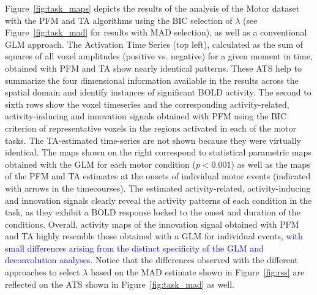 Figure~\ref{fig:task_maps} depicts the results of the analysis of the Motor
dataset with the PFM and TA algorithms using the BIC selection of $\lambda$ (see
Figure~\ref{fig:task_mad} for results with MAD selection), as well as a
conventional GLM approach. The Activation Time Series (top left), calculated as
the sum of squares of all voxel amplitudes (positive vs. negative) for a given
moment in time, obtained with PFM and TA show nearly identical patterns. These
ATS help to summarize the four dimensional information available in the results
across the spatial domain and identify instances of significant BOLD activity.
The second to sixth rows show the voxel timeseries and the corresponding
activity-related, activity-inducing and innovation signals obtained with PFM
using the BIC criterion of representative voxels in the regions activated in
each of the motor tasks. The TA-estimated time-series are not shown because they
were virtually identical. The maps shown on the right correspond to statistical
parametric maps obtained with the GLM for each motor condition ($p < 0.001$) as
well as the maps of the PFM and TA estimates at the onsets of individual motor
events (indicated with arrows in the timecourses). The estimated
activity-related, activity-inducing and innovation signals clearly reveal the
activity patterns of each condition in the task, as they exhibit a BOLD response
locked to the onset and duration of the conditions. Overall, activity maps of
the innovation signal obtained with PFM and TA highly resemble those obtained
with a GLM for individual events\textcolor{blue}{, with small differences
arising from the distinct specificity of the GLM and deconvolution analyses}.
Notice that the differences observed with the different approaches to select
$\lambda$ based on the MAD estimate shown in Figure~\ref{fig:rss} are reflected
on the ATS shown in Figure~\ref{fig:task_mad} as well.

